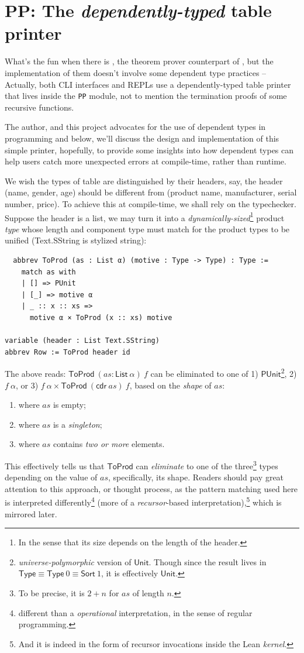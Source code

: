 \documentclass[a4paper, 11pt]{article}
\theoremstyle{remark}\newtheorem*{remark}{Remark}
\theoremstyle{definition}\newtheorem*{definition}{Definition}
\begin{document}
\section{PP: The \emph{dependently-typed} table printer}
What's the fun when there is \Tigrisd, the theorem prover counterpart of \Tigris, but
the implementation of them doesn't involve some dependent type practices -- Actually,
both CLI interfaces and REPLs use a dependently-typed table printer that lives inside
the \texttt{PP} module, not to mention the termination proofs of some recursive functions.

The author, and this project advocates for the use of dependent types in programming and
below, we'll discuss
the design and implementation of this simple printer, hopefully, to provide
some insights into how dependent types can help users
catch more unexpected errors at compile-time,
rather than runtime.

We wish the types of table are distinguished by their headers, say, the header (name, gender, age)
should be different from (product name, manufacturer, serial number, price).
To achieve this at compile-time, we shall rely on the typechecker.
Suppose the header is a list, we may turn it into a \emph{dynamically-sized}\footnote{
In the sense that its size depends on the length of the header.
}
product \emph{type} whose length
and component type must match for the product types to be unified (Text.SString is stylized string):
\begin{verbatim}
  abbrev ToProd (as : List α) (motive : Type -> Type) : Type :=
    match as with
    | [] => PUnit
    | [_] => motive α
    | _ :: x :: xs =>
      motive α × ToProd (x :: xs) motive

variable (header : List Text.SString)
abbrev Row := ToProd header id
\end{verbatim}

The above reads: $\mathsf{ToProd}\ (as : \mathsf{List}\ \alpha)\ f$ can be eliminated to one of 1) $\mathsf{PUnit}$\footnote{
\emph{universe-polymorphic} version of $\mathsf{Unit}$. Though since the result lives
in $\mathsf{Type}\equiv\mathsf{Type}\ 0\equiv\mathsf{Sort}\ 1$, it is effectively $\mathsf{Unit}$.
}, 2) $f\ \alpha$, or 3) $f\ \alpha \times \mathsf{ToProd}\ (\mathsf{cdr}\ as)\ f$,
based on the \emph{shape} of $as$:
\begin{enumerate}
\item where $as$ is empty;
\item where $as$ is a \emph{singleton};
\item where $as$ contains \emph{two or more} elements.
\end{enumerate}
This effectively tells us that $\mathsf{ToProd}$ can
\emph{eliminate} to one of the three\footnote{
To be precise, it is $2 + n$ for $as$ of length $n$.
} types depending on the value of $as$, specifically, its shape.
Readers should pay great attention to this approach, or thought process, as the
pattern matching used here is interpreted differently\footnote{different than a \emph{operational} interpretation, in the sense of regular programming.}
(more of a \emph{recursor}-based interpretation),\footnote{
And it is indeed in the form of recursor invocations inside the Lean \emph{kernel}.
}
which is mirrored later.
\end{document}
